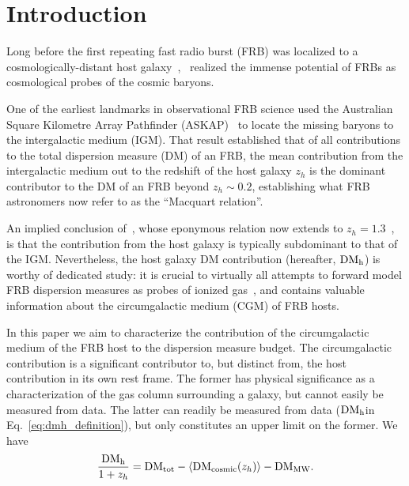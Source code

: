 \documentclass[twocolumn]{aastex631}
\newcommand{\dmh}{\ensuremath{{\rm DM}_\textrm{h}}}
\begin{document}
\section{Introduction}\label{sec:intro}
Long before the first repeating fast radio burst (FRB) was localized to a cosmologically-distant host galaxy~\citep{chatterjee2017direct,tendulkar2017host},~\citet{mcquinn2014locating} realized the immense potential of FRBs as cosmological probes of the cosmic baryons.

One of the earliest landmarks in observational FRB science used the Australian Square Kilometre Array Pathfinder (ASKAP)~\citep{macquart2020census} to locate the missing baryons to the intergalactic medium (IGM). That result established that of all contributions to the total dispersion measure (DM) of an FRB, the mean contribution from the intergalactic medium out to the redshift of the host galaxy $z_h$ is the dominant contributor to the DM of an FRB beyond $z_h \sim 0.2$, establishing what FRB astronomers now refer to as the ``Macquart relation''. 

An implied conclusion of~\citet{macquart2020census}, whose eponymous relation now extends to $z_h =  1.3$~\citep{ryder2023luminous,connor2024gas}, is that the contribution from the host galaxy is typically subdominant to that of the IGM. Nevertheless, the host galaxy DM contribution (hereafter, \dmh) is worthy of dedicated study: it is crucial to virtually all attempts to forward model FRB dispersion measures as probes of ionized gas~\citep{james2021z,james2022measurement,rafiei_ravandi2021chime,2019arXiv190102418M}, and contains valuable information about the circumgalactic medium (CGM) of FRB hosts.

In this paper we aim to characterize the contribution of the circumgalactic medium of the FRB host to the dispersion measure budget. The circumgalactic contribution is a significant contributor to, but distinct from, the host contribution in its own rest frame. The former has physical significance as a characterization of the gas column surrounding a galaxy, but cannot easily be measured from data. The latter can readily be measured from data (\dmh in Eq.~\ref{eq:dmh_definition}), but only constitutes an upper limit on the former. We have
\begin{equation}
\dfrac{\dmh}{1 + z_h} = \textrm{DM}_\mathrm{tot} - \langle \textrm{DM}_\textrm{cosmic}(z_h)\rangle - \textrm{DM}_{\textrm{MW}}.
\label{eq:dmh_definition}
\end{equation}
\end{document}
